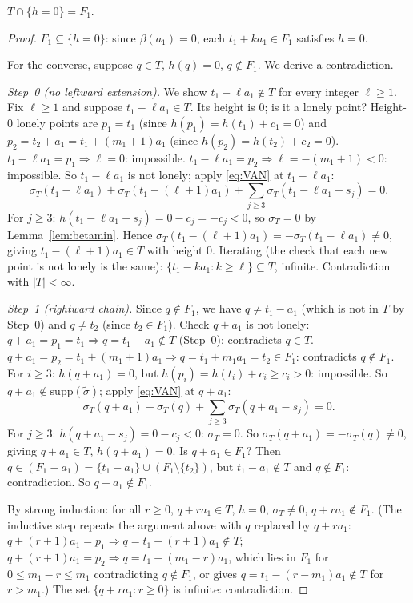\begin{lemma}[hzero]\label{lem:hzero}
$T\cap\{h=0\}=F_1$.
\end{lemma}
\begin{proof}
$F_1\subseteq\{h=0\}$: since $\beta(a_1)=0$, each $t_1+ka_1\in F_1$ satisfies $h=0$.

For the converse, suppose $q\in T$, $h(q)=0$, $q\notin F_1$.
We derive a contradiction.

\emph{Step~0 (no leftward extension).}
We show $t_1-\ell a_1\notin T$ for every integer $\ell\ge1$.
Fix $\ell\ge1$ and suppose $t_1-\ell a_1\in T$.
Its height is $0$; is it a lonely point?
Height-$0$ lonely points are $p_1=t_1$ (since $h(p_1)=h(t_1)+c_1=0$) and
$p_2=t_2+a_1=t_1+(m_1+1)a_1$ (since $h(p_2)=h(t_2)+c_2=0$).
$t_1-\ell a_1=p_1\Rightarrow\ell=0$: impossible.
$t_1-\ell a_1=p_2\Rightarrow\ell=-(m_1+1)<0$: impossible.
So $t_1-\ell a_1$ is not lonely; apply \eqref{eq:VAN} at $t_1-\ell a_1$:
\[
  \sigma_T(t_1-\ell a_1)+\sigma_T(t_1-(\ell{+}1)a_1)
  +\!\sum_{j\ge3}\!\sigma_T(t_1-\ell a_1-s_j)=0.
\]
For $j\ge3$: $h(t_1-\ell a_1-s_j)=0-c_j=-c_j<0$,
so $\sigma_T=0$ by Lemma~\ref{lem:betamin}.
Hence $\sigma_T(t_1-(\ell+1)a_1)=-\sigma_T(t_1-\ell a_1)\ne0$,
giving $t_1-(\ell+1)a_1\in T$ with height $0$.
Iterating (the check that each new point is not lonely is the same):
$\{t_1-ka_1:k\ge\ell\}\subseteq T$, infinite.  Contradiction with $|T|<\infty$.

\emph{Step~1 (rightward chain).}
Since $q\notin F_1$, we have $q\ne t_1-a_1$ (which is not in $T$ by Step~0) and $q\ne t_2$ (since $t_2\in F_1$).
Check $q+a_1$ is not lonely:
$q+a_1=p_1=t_1\Rightarrow q=t_1-a_1\notin T$ (Step~0): contradicts $q\in T$.
$q+a_1=p_2=t_1+(m_1+1)a_1\Rightarrow q=t_1+m_1 a_1=t_2\in F_1$:
contradicts $q\notin F_1$.
For $i\ge3$: $h(q+a_1)=0$, but $h(p_i)=h(t_i)+c_i\ge c_i>0$: impossible.
So $q+a_1\notin\mathrm{supp}(\tilde\sigma)$; apply \eqref{eq:VAN} at $q+a_1$:
\[
  \sigma_T(q+a_1)+\sigma_T(q)+\sum_{j\ge3}\sigma_T(q+a_1-s_j)=0.
\]
For $j\ge3$: $h(q+a_1-s_j)=0-c_j<0$: $\sigma_T=0$.
So $\sigma_T(q+a_1)=-\sigma_T(q)\ne0$, giving $q+a_1\in T$, $h(q+a_1)=0$.
Is $q+a_1\in F_1$?  Then $q\in(F_1-a_1)=\{t_1-a_1\}\cup(F_1\setminus\{t_2\})$,
but $t_1-a_1\notin T$ and $q\notin F_1$: contradiction.
So $q+a_1\notin F_1$.

By strong induction: for all $r\ge0$, $q+ra_1\in T$, $h=0$, $\sigma_T\ne0$, $q+ra_1\notin F_1$.
(The inductive step repeats the argument above with $q$ replaced by $q+ra_1$:
$q+(r+1)a_1=p_1\Rightarrow q=t_1-(r+1)a_1\notin T$;
$q+(r+1)a_1=p_2\Rightarrow q=t_1+(m_1-r)a_1$,
which lies in $F_1$ for $0\le m_1-r\le m_1$ contradicting $q\notin F_1$,
or gives $q=t_1-(r-m_1)a_1\notin T$ for $r>m_1$.)
The set $\{q+ra_1:r\ge0\}$ is infinite: contradiction.
\end{proof}

